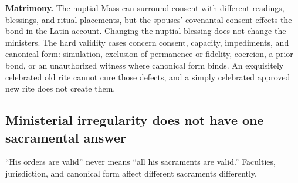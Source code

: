 \textbf{Matrimony.} The nuptial Mass can surround consent with different readings, blessings, and ritual placements, but the spouses' covenantal consent effects the bond in the Latin account. Changing the nuptial blessing does not change the ministers. The hard validity cases concern consent, capacity, impediments, and canonical form: simulation, exclusion of permanence or fidelity, coercion, a prior bond, or an unauthorized witness where canonical form binds. An exquisitely celebrated old rite cannot cure those defects, and a simply celebrated approved new rite does not create them.

\subsection{Ministerial irregularity does not have one sacramental answer}

“His orders are valid” never means “all his sacraments are valid.” Faculties, jurisdiction, and canonical form affect different sacraments differently.

